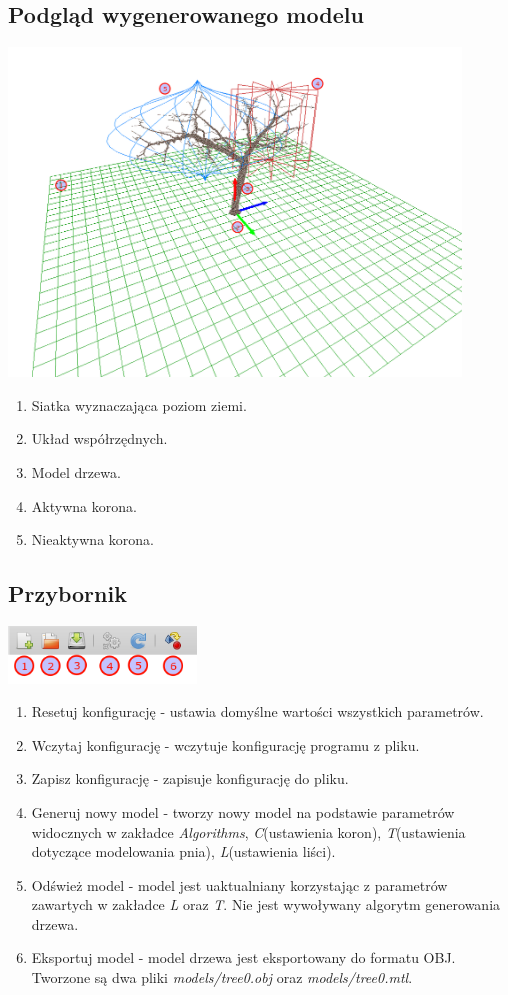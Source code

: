 \subsection{Podgląd wygenerowanego modelu}
\includegraphics[width=120mm]{images/gui/model_view.png}
\begin{enumerate}
	\item {Siatka wyznaczająca poziom ziemi.}
	\item {Układ współrzędnych.}
	\item {Model drzewa.}
	\item {Aktywna korona.}
	\item {Nieaktywna korona.}
\end{enumerate}

\subsection{Przybornik}
\includegraphics[width=50mm]{images/gui/toolbar.png}
\begin{enumerate}
	\item {Resetuj konfigurację - ustawia domyślne wartości wszystkich parametrów.}
	\item {Wczytaj konfigurację - wczytuje konfigurację programu z pliku. }
	\item {Zapisz konfigurację - zapisuje konfigurację do pliku.}
	\item {Generuj nowy model - tworzy nowy model na podstawie parametrów widocznych w zakładce \textit{Algorithms}, \textit{C}(ustawienia koron), \textit{T}(ustawienia dotyczące modelowania pnia), \textit{L}(ustawienia liści).}
	\item {Odśwież model - model jest uaktualniany korzystając z parametrów zawartych w zakładce \textit{L} oraz \textit{T}. Nie jest wywoływany algorytm generowania drzewa.}
	\item {Eksportuj model - model drzewa jest eksportowany do formatu OBJ. Tworzone są dwa pliki \textit{models/tree0.obj} oraz \textit{models/tree0.mtl}.}
\end{enumerate}

